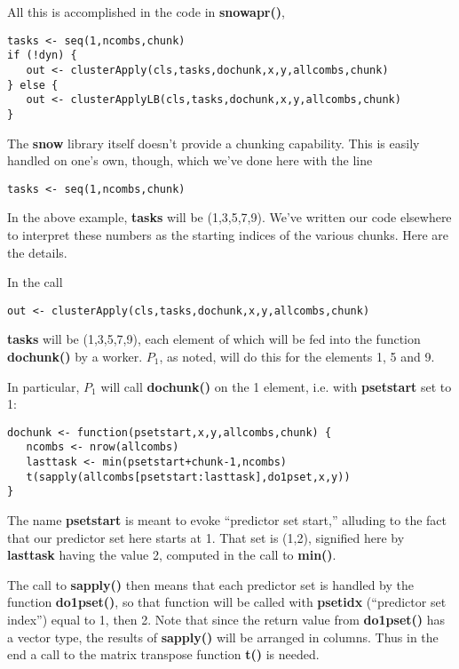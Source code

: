 All this is accomplished in the code in {\bf snowapr()}, 

\begin{lstlisting}
tasks <- seq(1,ncombs,chunk)
if (!dyn) {
   out <- clusterApply(cls,tasks,dochunk,x,y,allcombs,chunk)
} else {
   out <- clusterApplyLB(cls,tasks,dochunk,x,y,allcombs,chunk)
}
\end{lstlisting}



The {\bf snow} library itself doesn't provide a chunking
capability.  This is easily handled on one's own, though, which we've
done here with the line

\begin{lstlisting}
tasks <- seq(1,ncombs,chunk)
\end{lstlisting}

In the above example, {\bf tasks} will be (1,3,5,7,9).  We've written
our code elsewhere to interpret these numbers as the starting indices
of the various chunks.  Here are the details.

In the call

\begin{lstlisting}
out <- clusterApply(cls,tasks,dochunk,x,y,allcombs,chunk)
\end{lstlisting}

{\bf tasks} will be (1,3,5,7,9), each element of which will be fed into
the function {\bf dochunk()} by a worker.  $P_1$, as noted, will do this
for the elements 1, 5 and 9.

In particular, $P_1$ will call {\bf dochunk()} on the 1 element, i.e.
with {\bf psetstart} set to 1:  

\begin{lstlisting}
dochunk <- function(psetstart,x,y,allcombs,chunk) {
   ncombs <- nrow(allcombs)
   lasttask <- min(psetstart+chunk-1,ncombs)
   t(sapply(allcombs[psetstart:lasttask],do1pset,x,y))
}
\end{lstlisting}

The name {\bf psetstart} is meant to evoke ``predictor set start,''
alluding to the fact that our predictor set here starts at 1.  That set
is (1,2), signified here by {\bf lasttask} having the value 2, computed
in the call to {\bf min()}.  

The call to {\bf sapply()} then means that each predictor set is handled
by the function {\bf do1pset()}, so that function will be called with
{\bf psetidx} (``predictor set index'') equal to 1, then 2.   Note that
since the return value from {\bf do1pset()} has a vector type, the
results of {\bf sapply()} will be arranged in columns.  Thus in the end a
call to the matrix transpose function {\bf t()} is needed.

